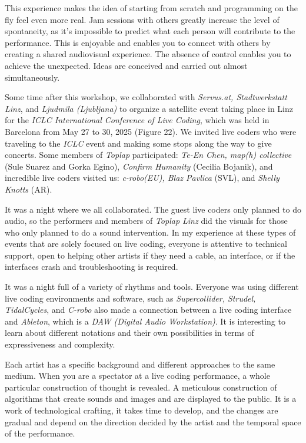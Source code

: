 \documentclass[12pt, twoside, a4paper]{report}
\begin{document}
This experience makes the idea of starting from scratch and programming on the fly feel even more real. Jam sessions with others greatly increase the level of spontaneity, as it's impossible to predict what each person will contribute to the performance. This is enjoyable and enables you to connect with others by creating a shared audiovisual experience. The absence of control enables you to achieve the unexpected. Ideas are conceived and carried out almost simultaneously.

Some time after this workshop, we collaborated with \textit{Servus.at, Stadtwerkstatt Linz}, and \textit{Ljudmila (Ljubljana)} to organize a satellite event taking place in Linz for the \textit{ICLC International Conference of Live Coding}, which was held in Barcelona from May 27 to 30, 2025 (Figure 22). We invited live coders who were traveling to the \textit{ICLC} event and making some stops along the way to give concerts. Some members of \textit{Toplap} participated: \textit{Te-En Chen, map(h) collective} (Sule Suarez and Gorka Egino), \textit{Confirm Humanity} (Cecilia Bojanik), and incredible live coders visited us: \textit{c-robo(EU), Blaz Pavlica} (SVL), and \textit{Shelly Knotts} (AR).



It was a night where we all collaborated. The guest live coders only planned to do audio, so the performers and members of \textit{Toplap Linz} did the visuals for those who only planned to do a sound intervention. In my experience at these types of events that are solely focused on live coding, everyone is attentive to technical support, open to helping other artists if they need a cable, an interface, or if the interfaces crash and troubleshooting is required.

It was a night full of a variety of rhythms and tools. Everyone was using different live coding environments and software, such as \textit{Supercollider, Strudel, TidalCycles}, and \textit{C-robo} also made a connection between a live coding interface and \textit{Ableton}, which is a \textit{DAW (Digital Audio Workstation)}. It is interesting to learn about different notations and their own possibilities in terms of expressiveness and complexity.

Each artist has a specific background and different approaches to the same medium. When you are a spectator at a live coding performance, a whole particular construction of thought is revealed. A meticulous construction of algorithms that create sounds and images and are displayed to the public. It is a work of technological crafting, it takes time to develop, and the changes are gradual and depend on the direction decided by the artist and the temporal space of the performance.
\end{document}
